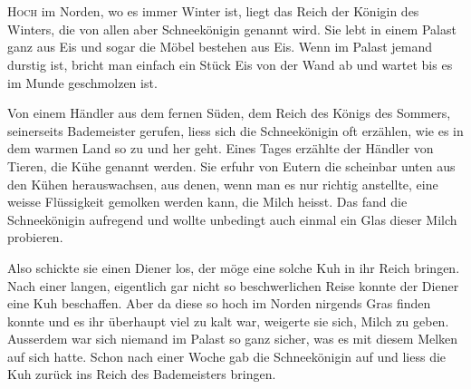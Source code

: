 \chapter*{}
\lettrine[lines=3]{\color{DeepPink}H}{och} im Norden, wo es immer Winter ist,
liegt das Reich der Königin des Winters, die von allen aber Schneekönigin
genannt wird. Sie lebt in einem Palast ganz aus Eis und sogar die Möbel
bestehen aus Eis. Wenn im Palast jemand durstig ist, bricht man einfach ein Stück Eis von der Wand ab und wartet bis es im Munde geschmolzen ist.

Von einem Händler aus dem fernen Süden, dem Reich des Königs des Sommers,
seinerseits Bademeister gerufen, liess sich die Schneekönigin oft erzählen, wie
es in dem warmen Land so zu und her geht.  Eines Tages erzählte der Händler von
Tieren, die Kühe genannt werden. Sie erfuhr von Eutern die scheinbar unten aus
den Kühen herauswachsen, aus denen, wenn man es nur richtig anstellte, eine weisse Flüssigkeit gemolken werden kann, die Milch heisst. Das fand die Schneekönigin aufregend und wollte unbedingt auch einmal ein Glas dieser Milch probieren. 

Also schickte sie einen Diener los, der möge eine solche Kuh in ihr Reich
bringen. Nach einer langen, eigentlich gar nicht so beschwerlichen Reise konnte
der Diener eine Kuh beschaffen. Aber da diese so hoch im Norden nirgends Gras
finden konnte und es ihr überhaupt viel zu kalt war, weigerte sie sich, Milch
zu geben. Ausserdem war sich niemand im Palast so ganz sicher, was es mit
diesem Melken auf sich hatte. Schon nach einer Woche gab die Schneekönigin auf
und liess die Kuh zurück ins Reich des Bademeisters bringen.

